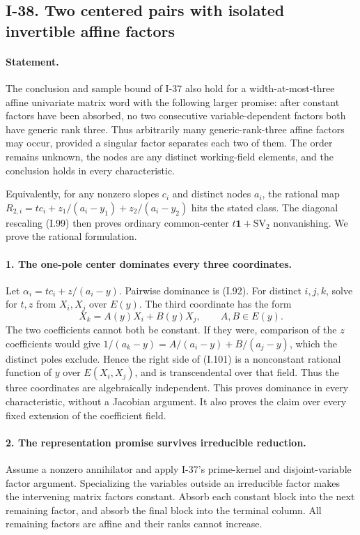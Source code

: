 \subsection{I-38. Two centered pairs with isolated invertible affine factors}
\label{I-38}

\paragraph{Statement.}
The conclusion and sample bound of I-37 also hold for a width-at-most-three
affine univariate matrix word with the following larger promise:
after constant factors have been absorbed, no two consecutive
variable-dependent factors both have generic rank three. Thus
arbitrarily many generic-rank-three affine factors may occur,
provided a singular factor separates each two of them. The order
remains unknown, the nodes are any distinct working-field elements,
and the conclusion holds in every characteristic.

Equivalently, for any nonzero slopes $c_i$ and distinct nodes $a_i$,
the rational map $R_{2,i}=tc_i+z_1/(a_i-y_1)+z_2/(a_i-y_2)$
hits the stated class. The diagonal rescaling (I.99) then proves
ordinary common-center $t\mathbf1+\mathrm{SV}_2$ nonvanishing.
We prove the rational formulation.

\paragraph{1. The one-pole center dominates every three coordinates.}
Let $\alpha_i=tc_i+z/(a_i-y)$. Pairwise dominance is (I.92).
For distinct $i,j,k$, solve for $t,z$ from $X_i,X_j$ over $E(y)$.
The third coordinate has the form
\[
 X_k=A(y)X_i+B(y)X_j,
 \qquad A,B\in E(y).
 \tag{I.101}
\]
The two coefficients cannot both be constant. If they were,
comparison of the $z$ coefficients would give
$1/(a_k-y)=A/(a_i-y)+B/(a_j-y)$, which the distinct poles
exclude. Hence the right side of (I.101) is a nonconstant
rational function of $y$ over $E(X_i,X_j)$, and is transcendental
over that field. Thus the three coordinates are algebraically
independent. This proves dominance in every characteristic,
without a Jacobian argument. It also proves the claim over every
fixed extension of the coefficient field.

\paragraph{2. The representation promise survives irreducible reduction.}
Assume a nonzero annihilator and apply I-37's prime-kernel and
disjoint-variable factor argument. Specializing the variables
outside an irreducible factor makes the intervening matrix
factors constant. Absorb each constant block into the next
remaining factor, and absorb the final block into the terminal
column. All remaining factors are affine and their ranks cannot
increase.

